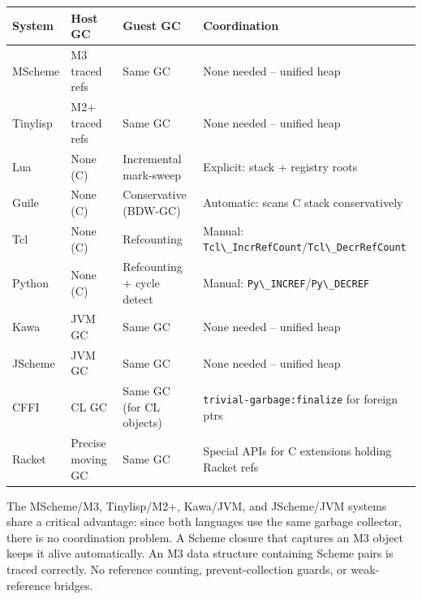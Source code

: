 \documentclass[
  12pt,
]{report}
\newcommand{\passthrough}[1]{#1}
\newcounter{none} %
\begin{document}
{\def\LTcaptype{none} %
\begin{longtable}[]{@{}
  >{\raggedright\arraybackslash}p{}
  >{\raggedright\arraybackslash}p{}
  >{\raggedright\arraybackslash}p{}
  >{\raggedright\arraybackslash}p{}@{}}
\toprule\noalign{}
\begin{minipage}[b]{\linewidth}\raggedright
System
\end{minipage} & \begin{minipage}[b]{\linewidth}\raggedright
Host GC
\end{minipage} & \begin{minipage}[b]{\linewidth}\raggedright
Guest GC
\end{minipage} & \begin{minipage}[b]{\linewidth}\raggedright
Coordination
\end{minipage} \\
\midrule\noalign{}
\endhead
\bottomrule\noalign{}
\endlastfoot
MScheme & M3 traced refs & Same GC & None needed -- unified heap \\
Tinylisp & M2+ traced refs & Same GC & None needed -- unified heap \\
Lua & None (C) & Incremental mark-sweep & Explicit: stack + registry
roots \\
Guile & None (C) & Conservative (BDW-GC) & Automatic: scans C stack
conservatively \\
Tcl & None (C) & Refcounting & Manual:
\passthrough{\lstinline!Tcl\_IncrRefCount!}/\passthrough{\lstinline!Tcl\_DecrRefCount!} \\
Python & None (C) & Refcounting + cycle detect & Manual:
\passthrough{\lstinline!Py\_INCREF!}/\passthrough{\lstinline!Py\_DECREF!} \\
Kawa & JVM GC & Same GC & None needed -- unified heap \\
JScheme & JVM GC & Same GC & None needed -- unified heap \\
CFFI & CL GC & Same GC (for CL objects) &
\passthrough{\lstinline!trivial-garbage:finalize!} for foreign ptrs \\
Racket & Precise moving GC & Same GC & Special APIs for C extensions
holding Racket refs \\
\end{longtable}
}

The MScheme/M3, Tinylisp/M2+, Kawa/JVM, and JScheme/JVM systems share a
critical advantage: since both languages use the same garbage collector,
there is no coordination problem. A Scheme closure that captures an M3
object keeps it alive automatically. An M3 data structure containing
Scheme pairs is traced correctly. No reference counting,
prevent-collection guards, or weak-reference bridges.
\end{document}
